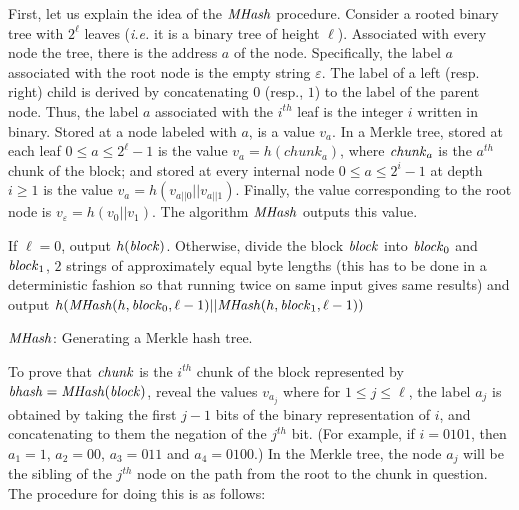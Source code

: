 First, let us explain the idea of the ${{\mathit{MHash}}}$ procedure.  Consider a rooted
binary tree with $2^\ell$ leaves (\emph{i.e.} it is a binary tree of
height $\ell$).  Associated with every node the tree, there is the
address $a$ of the node.  Specifically, the label $a$ associated with
the root node is the empty string $\varepsilon$. The label of a left
(resp. right) child is derived by concatenating $0$ (resp., $1$) to
the label of the parent node. Thus, the label $a$ associated with the
$i^{\mathit{th}}$ leaf is the integer $i$ written in binary.  Stored
at a node labeled with $a$, is a value $v_a$.  In a Merkle tree,
stored at each leaf $0\leq a\leq 2^\ell-1$ is the value $v_a =
h(chunk_a)$, where ${{\mathit{chunk}}}_a$ is the $a^\mathit{th}$ chunk of the block; 
and stored at every internal node $0\leq a \leq 2^i-1$ at
depth $i\geq 1$ is the value $v_a=h(v_{a||0}||v_{a||1})$.  Finally,
the value corresponding to the root node is $v_\varepsilon =
h(v_0||v_1)$.  The algorithm ${{\mathit{MHash}}}$ outputs this value.

\begin{algorithm}[H]\label{alg:merkle}
\dontprintsemicolon

\BlankLine



\Indp
  If $\ell=0$, output $h({{\mathit{block}}})$. \;
  Otherwise, divide the block ${{\mathit{block}}}$ into ${{\mathit{block}}}_0$ and ${{\mathit{block}}}_1$, $2$ strings of approximately equal byte lengths (this has to be done in a deterministic fashion so that running twice on same input gives same results) and output $h({{\mathit{MHash}}}(h,{{\mathit{block}}}_0,\ell-1)||{{\mathit{MHash}}}(h,{{\mathit{block}}}_1,\ell-1))$\;
\Indm

\caption{${{\mathit{MHash}}}$: Generating a Merkle hash tree.}
\end{algorithm}


To prove that ${{\mathit{chunk}}}$ is the $i^\mathit{th}$ chunk of the block
represented by ${{\mathit{bhash}}}={{\mathit{MHash}}}({{\mathit{block}}})$, reveal the values $v_{a_j}$
where for $1 \leq j \leq \ell$, the label $a_j$ is obtained by taking
the first $j-1$ bits of the binary representation of $i$, and
concatenating to them the negation of the $j^\mathit{th}$ bit. (For
example, if $i = 0101$, then $a_1 = 1$, $a_2=00$, $a_3=011$ and $a_4 =
0100$.)  In the Merkle tree, the node $a_j$ will be the sibling of the
$j^\mathit{th}$ node on the path from the root to the chunk in
question.  The procedure for doing this is as follows:


